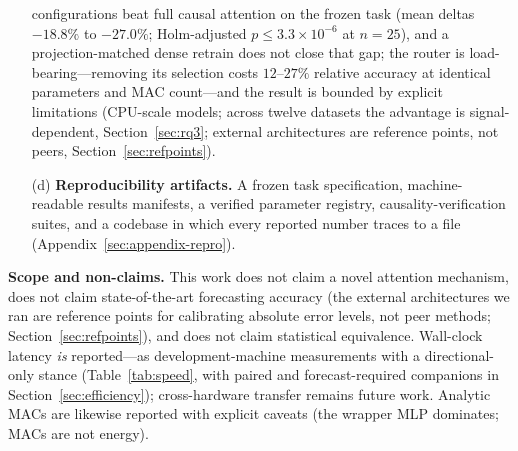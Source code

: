 \begin{enumerate}
        configurations beat full causal attention on the frozen task
        (mean deltas $-18.8\%$ to $-27.0\%$; Holm-adjusted
        $p \le 3.3\times10^{-6}$ at $n{=}25$), and a projection-matched dense
        retrain does not close that gap; the router is load-bearing---removing
        its selection costs $12$--$27\%$ relative accuracy at identical
        parameters and MAC count---and the result is bounded by explicit
        limitations (CPU-scale models; across twelve datasets the
        advantage is signal-dependent, Section~\ref{sec:rq3}; external
        architectures are reference points, not peers,
        Section~\ref{sec:refpoints}).
  \item[(d)] \textbf{Reproducibility artifacts.} A frozen task specification,
        machine-readable results manifests, a verified parameter registry,
        causality-verification suites, and a codebase in which every reported
        number traces to a file (Appendix~\ref{sec:appendix-repro}).
\end{enumerate}

\textbf{Scope and non-claims.} This work does not claim a novel attention
mechanism, does not claim state-of-the-art forecasting accuracy (the
external architectures we ran are reference points for calibrating absolute
error levels, not peer methods; Section~\ref{sec:refpoints}),
and does not claim statistical equivalence. Wall-clock latency \emph{is}
reported---as development-machine measurements with a directional-only stance
(Table~\ref{tab:speed}, with paired and forecast-required companions in
Section~\ref{sec:efficiency}); cross-hardware transfer remains future work.
Analytic MACs are likewise reported with explicit caveats (the wrapper MLP
dominates; MACs are not energy).
